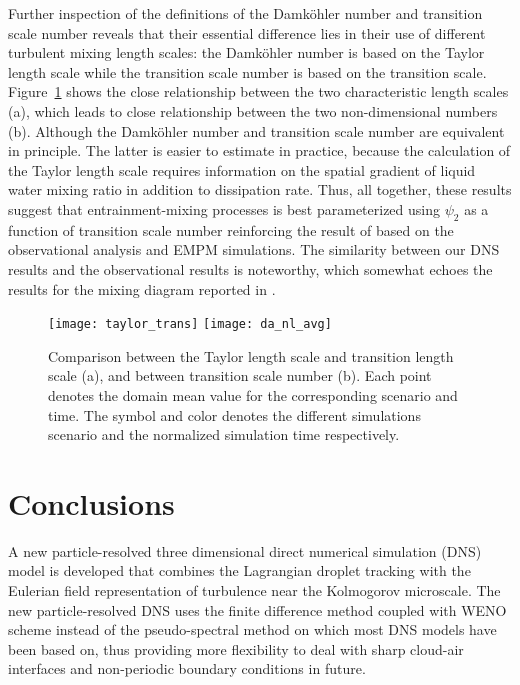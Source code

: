 \documentclass[draft,linenumbers]{agujournal}
\newcommand{\Fig}[1]{Figure~\ref{#1}}
\begin{document}
Further inspection of the definitions of the Damk\"ohler number and transition scale number reveals that their essential difference lies in their use of different turbulent mixing length scales: the Damk\"ohler number is based on the Taylor length scale while the transition scale number is based on the transition scale. {\color{green} \Fig{fig:TaylorScaleTranScale} shows the close relationship between the two characteristic length scales (a), which leads to  close relationship between the two non-dimensional numbers (b). Although the Damk\"{o}hler number and transition scale number are equivalent in principle. The latter} is easier to estimate in practice, because the calculation of the Taylor length scale requires information on the spatial gradient of liquid water mixing ratio in addition to dissipation rate. Thus, all together, these results suggest that entrainment-mixing processes is best parameterized using $\psi_2$ as a function of transition scale number reinforcing the result of  \citet{Lu2013a} based on the  observational analysis and EMPM simulations. {\color{green}The similarity between our DNS results and the observational results is noteworthy, which somewhat echoes the results for the mixing diagram reported in \citet{Kumar2017}.}     
\begin{figure}\centering
\texttt{[image: taylor\_trans]}
\texttt{[image: da\_nl\_avg]}
\caption{Comparison between the Taylor length scale and transition length scale (a), and between transition scale number (b). Each point denotes the domain mean value for the corresponding scenario and time. The symbol and color denotes the different simulations scenario and the normalized simulation time respectively. \label{fig:TaylorScaleTranScale}}
\end{figure}

\section{Conclusions}\label{conclusion}
A new particle-resolved three dimensional direct numerical simulation (DNS) model is developed that combines the Lagrangian droplet tracking with the Eulerian field representation of turbulence near the Kolmogorov microscale. The new particle-resolved DNS uses the finite difference method coupled with WENO  scheme instead of the pseudo-spectral method on which most DNS models have been based on, thus providing more flexibility to deal with sharp cloud-air interfaces and non-periodic boundary conditions in future.
\end{document}

